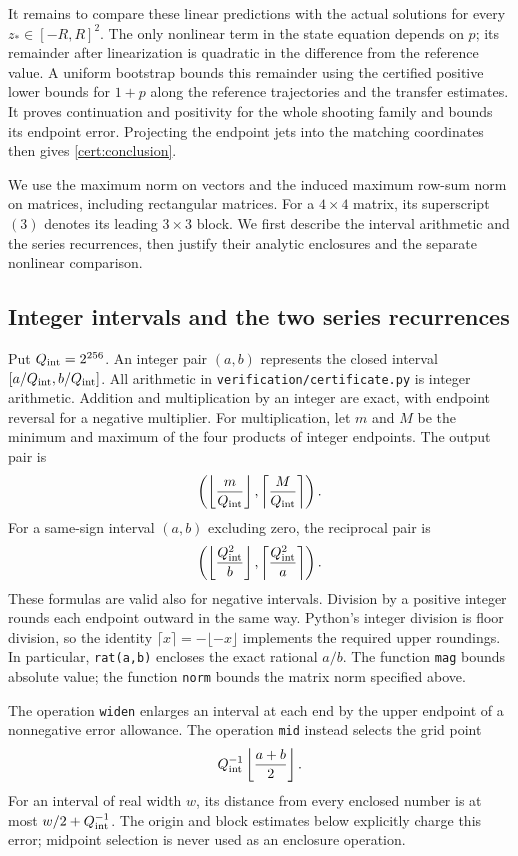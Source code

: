It remains to compare these linear predictions with the actual
solutions for every \(z_*\in[-R,R]^2\).  The only nonlinear term in the
state equation depends on \(p\); its remainder after linearization
is quadratic in the difference from the reference value.  A uniform
bootstrap bounds this remainder using the certified positive lower
bounds for \(1+p\) along the reference trajectories and the transfer estimates.
It proves continuation and positivity for the whole shooting family and bounds its endpoint
error.  Projecting the endpoint jets into the matching coordinates
then gives \eqref{cert:conclusion}.

We use the maximum norm on vectors and the induced maximum row-sum
norm on matrices, including rectangular matrices.  For a
\(4\times4\) matrix, its superscript \((3)\) denotes its leading
\(3\times3\) block.  We first describe the interval arithmetic and
the series recurrences, then justify their analytic enclosures and
the separate nonlinear comparison.

\subsection{Integer intervals and the two series recurrences}
\label{cert:arithmetic}

Put \(Q_{\rm int}=2^{256}\).  An integer pair \((a,b)\) represents the closed
interval \([a/Q_{\rm int},b/Q_{\rm int}]\).  All arithmetic in
\texttt{verification/certificate.py} is integer arithmetic.  Addition and
multiplication by an integer are exact, with endpoint reversal for a negative
multiplier.  For multiplication, let \(m\) and \(M\) be the minimum and maximum
of the four products of integer endpoints.  The output pair is
\[
 \left(\left\lfloor\frac{m}{Q_{\rm int}}\right\rfloor,
       \left\lceil\frac{M}{Q_{\rm int}}\right\rceil\right).
\]
For a same-sign interval \((a,b)\) excluding zero, the reciprocal pair is
\[
 \left(\left\lfloor\frac{Q_{\rm int}^2}{b}\right\rfloor,
       \left\lceil\frac{Q_{\rm int}^2}{a}\right\rceil\right).
\]
These formulas are valid also for negative intervals.  Division by a positive
integer rounds each endpoint outward in the same way.  Python's integer
division is floor division, so the identity
\(\lceil x\rceil=-\lfloor-x\rfloor\) implements the required upper roundings.
In particular, \texttt{rat(a,b)} encloses the exact rational \(a/b\).
The function \texttt{mag} bounds absolute value; the function \texttt{norm}
bounds the matrix norm specified above.

The operation \texttt{widen} enlarges an interval at each end by the upper
endpoint of a nonnegative error allowance.  The operation \texttt{mid} instead
selects the grid point
\[
 Q_{\rm int}^{-1}\left\lfloor\frac{a+b}{2}\right\rfloor.
\]
For an interval of real width \(w\), its distance from every enclosed number
is at most \(w/2+Q_{\rm int}^{-1}\).  The origin and block estimates below
explicitly charge this error; midpoint selection is never used as an
enclosure operation.

